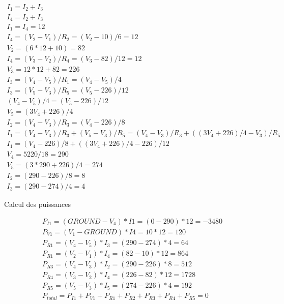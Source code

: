\documentclass{homeworg}
\begin{document}
    \begin{align}
        I_1 = I_2 + I_3\\
        I_4 = I_2 + I_3\\
        I_1 = I_4 = 12 \\
        I_4 = (V_2 - V_1) / R_2 = (V_2 - 10) / 6 = 12\\
        V_2 = (6 * 12 + 10) = 82\\
        I_4 = (V_3 - V_2) / R_4 = (V_3 - 82) / 12 = 12\\
        V_3 = 12 * 12 + 82 = 226\\
        I_3 = (V_4 - V_5) / R_1 = (V_4 - V_5) / 4\\
        I_3 = (V_5 - V_3) / R_5 = (V_5 - 226) / 12\\
        (V_4 - V_5) / 4 = (V_5 - 226) / 12\\
        V_5 = (3V_4 + 226) / 4\\
        I_2 = (V_4 - V_3) / R_3 = (V_4 - 226) / 8\\
        I_1 = (V_4 - V_3) / R_3 + (V_5 - V_3) / R_5 =
        (V_4 - V_3) / R_3 + ((3V_4 + 226) / 4 - V_3) / R_5\\
        I_1 = (V_4 - 226) / 8 + ((3V_4 + 226)/4 - 226)/12\\
        V_4 = 5220 / 18 = 290\\
        V_5 = (3 * 290 + 226) / 4 = 274\\
        I_2 = (290 - 226) / 8 = 8\\
        I_3 = (290 - 274) / 4 = 4
    \end{align}
    \newpage
    \begin{center}
    \large
        Calcul des puissances
    \end{center}
    
    \normalsize
    \begin{align}
        P_{I1} = (GROUND - V_4) * I1 = (0 - 290) * 12 = -3480\\
        P_{V1} = (V_1 - GROUND) * I4 = 10 * 12 = 120\\
        P_{R1} = (V_4 - V_5) * I_3 = (290 - 274) * 4 = 64\\
        P_{R1} = (V_2 - V_1) * I_4 = (82 - 10) * 12 = 864\\
        P_{R3} = (V_4 - V_3) * I_2 = (290 - 226) * 8 = 512\\
        P_{R4} = (V_3 - V_2) * I_4 = (226 - 82) * 12 = 1728\\
        P_{R5} = (V_5 - V_3) * I_5 = (274 - 226) * 4 = 192\\
        P_{total} = P_{I1} + P_{V1} + P_{R1} + P_{R2} + P_{R3} + P_{R4} + P_{R5} = 0
    \end{align}
\end{document}
